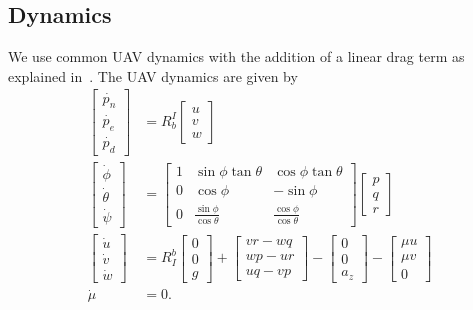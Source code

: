 \subsection{Dynamics}
We use common UAV dynamics with the addition of a linear drag term as explained
in~\cite{leishman2014accel}. The UAV dynamics are given by
\begin{align}
  \begin{bmatrix}
    \dot{p_n} \\
    \dot{p_e} \\
    \dot{p_d}
  \end{bmatrix}
  &=
  R_b^I
  \begin{bmatrix}
    u \\
    v \\
    w
  \end{bmatrix}
  \\
  \begin{bmatrix}
    \dot{\phi} \\
    \dot{\theta} \\
    \dot{\psi}
  \end{bmatrix}
  &=
  \begin{bmatrix}
    1 & \sin\phi\tan\theta & \cos\phi\tan\theta \\
    0 & \cos\phi & -\sin\phi \\
    0 & \frac{\sin\phi}{\cos\theta} & \frac{\cos\phi}{\cos\theta}
  \end{bmatrix}
  \begin{bmatrix}
    p \\
    q \\
    r 
  \end{bmatrix}
  \\
  \begin{bmatrix}
    \dot{u} \\
    \dot{v} \\
    \dot{w}
  \end{bmatrix}
  &=
  R_I^b
  \begin{bmatrix}
    0 \\
    0 \\
    g
  \end{bmatrix}
  +
  \begin{bmatrix}
    vr - wq \\
    wp - ur \\
    uq - vp
  \end{bmatrix}
  -
  \begin{bmatrix}
    0 \\
    0 \\
    a_z
  \end{bmatrix}
  -
  \begin{bmatrix}
    \mu u \\
    \mu v \\
    0
  \end{bmatrix}
  \\
  \dot{\mu} &= 0.
\end{align}
